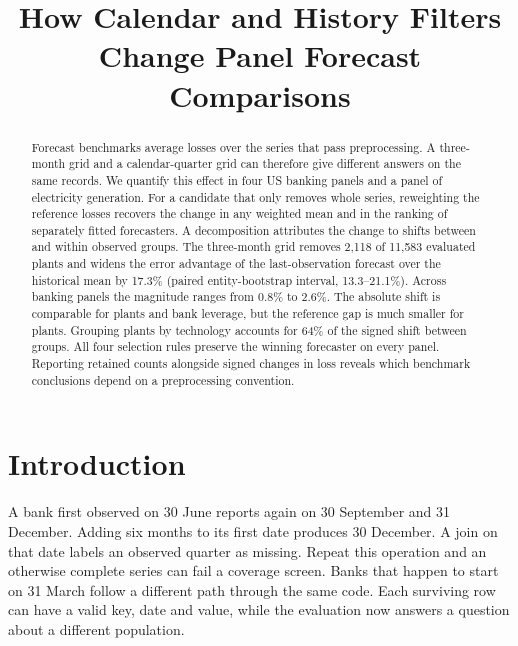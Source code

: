\documentclass[linenumber]{jdsart}
\begin{document}
\begin{frontmatter}
\title{How Calendar and History Filters Change Panel Forecast Comparisons}
\author[1]{ }
\author[1]{ }
\address[1]{Independent Researcher, Suzhou, }
\begin{abstract}
Forecast benchmarks average losses over the series that pass preprocessing. A three-month grid and a calendar-quarter grid can therefore give different answers on the same records. We quantify this effect in four US banking panels and a panel of electricity generation. For a candidate that only removes whole series, reweighting the reference losses recovers the change in any weighted mean and in the ranking of separately fitted forecasters. A decomposition attributes the change to shifts between and within observed groups. The three-month grid removes 2,118 of 11,583 evaluated plants and widens the error advantage of the last-observation forecast over the historical mean by 17.3\% (paired entity-bootstrap interval, 13.3--21.1\%). Across banking panels the magnitude ranges from 0.8\% to 2.6\%. The absolute shift is comparable for plants and bank leverage, but the reference gap is much smaller for plants. Grouping plants by technology accounts for 64\% of the signed shift between groups. All four selection rules preserve the winning forecaster on every panel. Reporting retained counts alongside signed changes in loss reveals which benchmark conclusions depend on a preprocessing convention.
\end{abstract}
\begin{keyword}\end{keyword}
\end{frontmatter}

\section{Introduction}
A bank first observed on 30 June reports again on 30 September and 31 December. Adding six months to its first date produces 30 December. A join on that date labels an observed quarter as missing. Repeat this operation and an otherwise complete series can fail a coverage screen. Banks that happen to start on 31 March follow a different path through the same code. Each surviving row can have a valid key, date and value, while the evaluation now answers a question about a different population.
\end{document}
